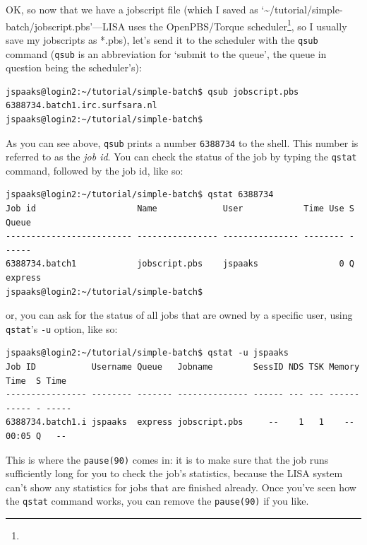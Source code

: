 OK, so now that we have a jobscript file (which I saved as `\textasciitilde{}/tutorial/simple-batch/jobscript.pbs'---LISA uses the OpenPBS/Torque scheduler\footnote{}, so I usually save my jobscripts as *.pbs), let's send it to the scheduler with the \lstinline[style=bashinline]{qsub} command (\lstinline[style=bashinline]{qsub} is an abbreviation for `submit to the queue', the queue in question being the scheduler's):
\begin{lstlisting}[style=basic,style=bash]
jspaaks@login2:~/tutorial/simple-batch$ qsub jobscript.pbs
6388734.batch1.irc.surfsara.nl
jspaaks@login2:~/tutorial/simple-batch$
\end{lstlisting}

As you can see above, \lstinline[style=bashinline]{qsub} prints a number \lstinline[style=bashinline]{6388734} to the shell. This number is referred to as the \textit{job id}.
You can check the status of the job by typing the \lstinline[style=bashinline]{qstat} command, followed by the job id, like so:
\begin{lstlisting}[style=basic,style=bash]
jspaaks@login2:~/tutorial/simple-batch$ qstat 6388734
Job id                    Name             User            Time Use S Queue
------------------------- ---------------- --------------- -------- - -----
6388734.batch1            jobscript.pbs    jspaaks                0 Q express
jspaaks@login2:~/tutorial/simple-batch$
\end{lstlisting}
or, you can ask for the status of all jobs that are owned by a specific user, using \lstinline[style=bashinline]{qstat}'s \lstinline[style=bashinline]{-u} option, like so:
\begin{lstlisting}[style=basic,style=bash]
jspaaks@login2:~/tutorial/simple-batch$ qstat -u jspaaks
Job ID           Username Queue   Jobname        SessID NDS TSK Memory Time  S Time
---------------- -------- ------- -------------- ------ --- --- ------ ----- - -----
6388734.batch1.i jspaaks  express jobscript.pbs     --    1   1    --  00:05 Q   --
\end{lstlisting}
This is where the \lstinline[style=bashinline]{pause(90)} comes in: it is to make sure that the job runs sufficiently long for you to check the job's statistics, because the LISA system can't show any statistics for jobs that are finished already. Once you've seen how the \lstinline[style=bashinline]{qstat} command works, you can remove the \lstinline[style=bashinline]{pause(90)} if you like.

